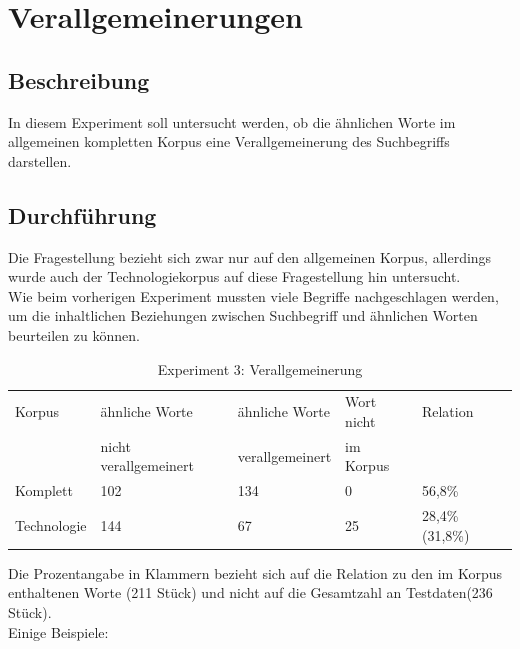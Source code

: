 \documentclass[12pt,a4paper]{report}
\begin{document}
		
	\newpage
	\section{Verallgemeinerungen}
		\subsection{Beschreibung}
		In diesem Experiment soll untersucht werden, ob die ähnlichen Worte im allgemeinen kompletten Korpus eine Verallgemeinerung des Suchbegriffs darstellen.\\
		
		\subsection{Durchführung}
		Die Fragestellung bezieht sich zwar nur auf den allgemeinen Korpus, allerdings wurde auch der Technologiekorpus auf diese Fragestellung hin untersucht.\\
		Wie beim vorherigen Experiment mussten viele Begriffe nachgeschlagen werden,  um die inhaltlichen Beziehungen zwischen Suchbegriff und ähnlichen Worten beurteilen zu können.\\
		
\begin{table}[h]
\caption{Experiment 3: Verallgemeinerung}
\begin{center}
\begin{tabular}{|l||l|l|l|l|}
\hline
Korpus & ähnliche Worte & ähnliche Worte  & Wort nicht  & Relation\\
 & nicht verallgemeinert & verallgemeinert & im Korpus & \\

\hline
 Komplett & 102 & 134 & 0 & 56,8\% \\
 \hline
 Technologie & 144 & 67 & 25 & 28,4\% (31,8\%)\\
 \hline
 
\end{tabular}
\end{center}
\end{table}

		Die Prozentangabe in Klammern bezieht sich auf die Relation zu den im Korpus enthaltenen Worte (211 Stück) und nicht auf die Gesamtzahl an Testdaten(236 Stück).\\
		
Einige Beispiele:\\
		
\end{document}
